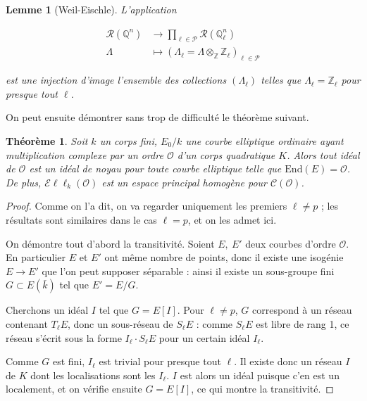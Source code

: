 \documentclass[11pt,a4paper]{article}
\newcommand{\Z}{\mathbb{Z}}
\newcommand{\Q}{\mathbb{Q}}
\renewcommand{\O}{\mathcal{O}}
\newcommand{\Cl}{\mathcal{C}}
\newcommand{\vers}{\rightarrow}
\newcommand{\End}{\mathrm{End}}
\newcommand{\Ell}{\mathcal{E}\ell\ell}
\newtheorem*{thm}{Théorème}
\newtheorem*{lem}{Lemme}
\theoremstyle{definition}
\begin{document}
\begin{lem}[Weil-Eischle] L'application

$$\begin{aligned}
\mathcal{R}(\Q^n) &\longrightarrow \prod_{\ell\in \mathcal{P}} \mathcal{R}(\Q_\ell^n) \\
\Lambda\ \ &\longmapsto (\Lambda_\ell = \Lambda\otimes_\Z \Z_\ell)_{\ell\in\mathcal{P}}
\end{aligned}$$

est une injection d'image l'ensemble des collections $(\Lambda_\ell)$ telles que $\Lambda_\ell = \Z_\ell$ pour presque tout $\ell$.
\end{lem}

On peut ensuite démontrer sans trop de difficulté le théorème suivant.

\begin{thm}

Soit $k$ un corps fini, $E_0/k$ une courbe elliptique ordinaire ayant multiplication complexe par un ordre $\O$ d'un corps quadratique $K$. Alors tout idéal de $\O$ est un idéal de noyau pour toute courbe elliptique telle que $\End(E)=\O$. De plus, $\Ell_k(\O)$ est un espace principal homogène pour $\Cl(\O)$.

\end{thm}


\begin{proof}

Comme on l'a dit, on va regarder uniquement les premiers $\ell\neq p$ ; les résultats sont similaires dans le cas $\ell = p$, et on les admet ici.

On démontre tout d'abord la transitivité. Soient $E,\ E'$ deux courbes d'ordre $\O$. En particulier $E$ et $E'$ ont même nombre de points, donc il existe une isogénie $E \vers E'$ que l'on peut supposer séparable : ainsi il existe un sous-groupe fini $G\subset E(\bar{k})$ tel que $E' = E/G$.

Cherchons un idéal $I$ tel que $G = E[I]$. Pour $\ell\neq p$, $G$ correspond à un réseau contenant $T_\ell E$, donc un sous-réseau de $S_\ell E$ : comme $S_\ell E$ est libre de rang 1, ce réseau s'écrit sous la forme $I_\ell \cdot S_\ell E$ pour un certain idéal $I_\ell$.

Comme $G$ est fini, $I_\ell$ est trivial pour presque tout $\ell$. Il existe donc un réseau $I$ de $K$ dont les localisations sont les $I_\ell$. $I$ est alors un idéal puisque c'en est un localement, et on vérifie ensuite $G = E[I]$, ce qui montre la transitivité.

\end{proof}
\end{document}
